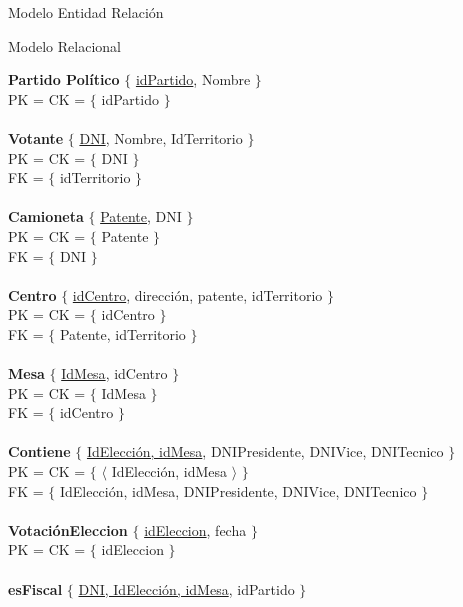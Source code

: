 \begin{section}{Modelo Entidad Relaci\'on}

\begin{subsection}{Modelo Relacional}

\noindent \textbf{Partido Pol\'itico} $\lbrace$ \underline{idPartido}, Nombre $\rbrace$ \\
PK = CK = $ \lbrace $ idPartido $ \rbrace $ \\
\\
\textbf{Votante} $ \lbrace $ \underline{DNI}, Nombre, IdTerritorio $ \rbrace $\\
PK = CK = $ \lbrace $ DNI $ \rbrace $\\
FK = $ \lbrace $ idTerritorio $ \rbrace $\\
\\
\textbf{Camioneta} $ \lbrace $ \underline{Patente}, DNI $ \rbrace $\\
PK = CK = $ \lbrace $ Patente  $ \rbrace $\\
FK = $ \lbrace $ DNI $ \rbrace $\\
\\
\textbf{Centro} $ \lbrace $ \underline{idCentro}, direcci\'on, patente, idTerritorio $ \rbrace $ \\
PK = CK = $ \lbrace $ idCentro $ \rbrace $ \\
FK = $ \lbrace $ Patente, idTerritorio $ \rbrace $\\
\\
\textbf{Mesa} $ \lbrace $ \underline{IdMesa}, idCentro $ \rbrace $ \\
PK = CK = $ \lbrace $ IdMesa $ \rbrace $ \\
FK = $ \lbrace $ idCentro $ \rbrace $\\
\\
\textbf{Contiene} $ \lbrace $ \underline{IdElecci\'on, idMesa}, DNIPresidente, DNIVice, DNITecnico $ \rbrace $ \\
PK = CK = $ \lbrace $ $ \langle $ IdElecci\'on, idMesa $ \rangle $ $ \rbrace $ \\
FK = $ \lbrace $ IdElecci\'on, idMesa, DNIPresidente, DNIVice, DNITecnico $ \rbrace $\\
\\
\textbf{Votaci\'onEleccion} $ \lbrace $ \underline{idEleccion}, fecha $ \rbrace $ \\
PK = CK = $ \lbrace $ idEleccion $ \rbrace $ \\
\\
\textbf{esFiscal} $ \lbrace $ \underline{DNI, IdElecci\'on, idMesa}, idPartido $ \rbrace $ \\

\end{subsection}
\end{section}
